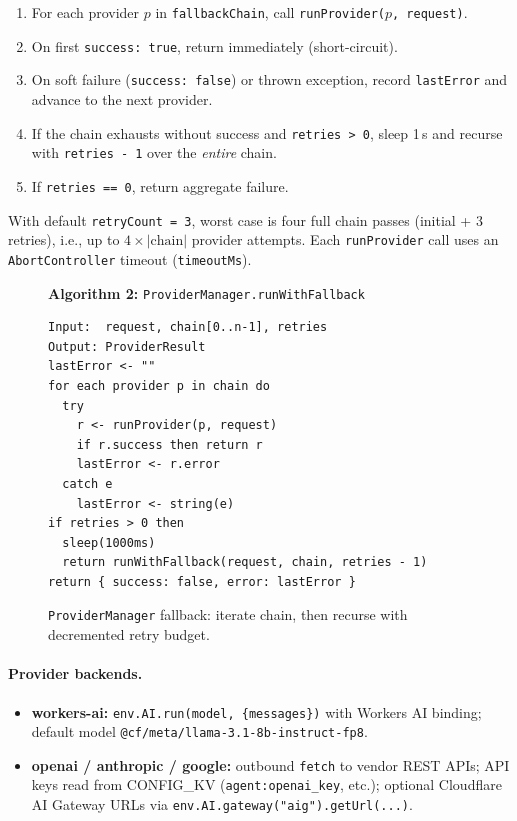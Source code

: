 \begin{enumerate}
  \item For each provider $p$ in \texttt{fallbackChain}, call \texttt{runProvider($p$, request)}.
  \item On first \texttt{success: true}, return immediately (short-circuit).
  \item On soft failure (\texttt{success: false}) or thrown exception, record \texttt{lastError} and advance to the next provider.
  \item If the chain exhausts without success and \texttt{retries > 0}, sleep 1\,s and recurse with \texttt{retries - 1} over the \emph{entire} chain.
  \item If \texttt{retries == 0}, return aggregate failure.
\end{enumerate}

With default \texttt{retryCount = 3}, worst case is four full chain passes (initial + 3 retries), i.e., up to $4 \times |\text{chain}|$ provider attempts. Each \texttt{runProvider} call uses an \texttt{AbortController} timeout (\texttt{timeoutMs}).

\begin{figure}[t]
  \centering
  \begin{minipage}{0.92\linewidth}
  \textbf{Algorithm 2:} \texttt{ProviderManager.runWithFallback}
  \label{alg:provider-fallback}
  \small
  \begin{lstlisting}
Input:  request, chain[0..n-1], retries
Output: ProviderResult
lastError <- ""
for each provider p in chain do
  try
    r <- runProvider(p, request)
    if r.success then return r
    lastError <- r.error
  catch e
    lastError <- string(e)
if retries > 0 then
  sleep(1000ms)
  return runWithFallback(request, chain, retries - 1)
return { success: false, error: lastError }
  \end{lstlisting}
  \end{minipage}
  \caption{\texttt{ProviderManager} fallback: iterate chain, then recurse with decremented retry budget.}
  \label{fig:provider-fsm}
\end{figure}

\paragraph{Provider backends.}
\begin{itemize}
  \item \textbf{workers-ai:} \texttt{env.AI.run(model, \{messages\})} with Workers AI binding; default model \texttt{@cf/meta/llama-3.1-8b-instruct-fp8}.
  \item \textbf{openai / anthropic / google:} outbound \texttt{fetch} to vendor REST APIs; API keys read from CONFIG\_KV (\texttt{agent:openai\_key}, etc.); optional Cloudflare AI Gateway URLs via \texttt{env.AI.gateway("aig").getUrl(...)}.
\end{itemize}

